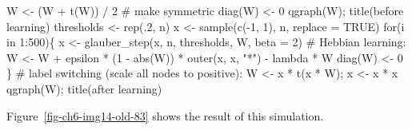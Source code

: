 \documentclass[
  a4paper,
  DIV=11,
  numbers=noendperiod,
  oneside]{scrreprt}
\newenvironment{Shaded}{}{}
\newcommand{\AttributeTok}[1]{\textcolor[rgb]{0.84,0.23,0.29}{#1}}
\newcommand{\CommentTok}[1]{\textcolor[rgb]{0.42,0.45,0.49}{#1}}
\newcommand{\ConstantTok}[1]{\textcolor[rgb]{0.00,0.36,0.77}{#1}}
\newcommand{\ControlFlowTok}[1]{\textcolor[rgb]{0.84,0.23,0.29}{#1}}
\newcommand{\DecValTok}[1]{\textcolor[rgb]{0.00,0.36,0.77}{#1}}
\newcommand{\FunctionTok}[1]{\textcolor[rgb]{0.44,0.26,0.76}{#1}}
\newcommand{\NormalTok}[1]{\textcolor[rgb]{0.14,0.16,0.18}{#1}}
\newcommand{\OtherTok}[1]{\textcolor[rgb]{0.44,0.26,0.76}{#1}}
\newcommand{\SpecialCharTok}[1]{\textcolor[rgb]{0.00,0.36,0.77}{#1}}
\newcommand{\StringTok}[1]{\textcolor[rgb]{0.01,0.18,0.38}{#1}}
\begin{document}
\begin{Shaded}
\begin{Highlighting}[]
\NormalTok{W }\OtherTok{\textless{}{-}}\NormalTok{ (W }\SpecialCharTok{+} \FunctionTok{t}\NormalTok{(W)) }\SpecialCharTok{/} \DecValTok{2} \CommentTok{\# make symmetric}
\FunctionTok{diag}\NormalTok{(W) }\OtherTok{\textless{}{-}} \DecValTok{0}
\FunctionTok{qgraph}\NormalTok{(W); }\FunctionTok{title}\NormalTok{(}\StringTok{\textquotesingle{}before learning\textquotesingle{}}\NormalTok{)}
\NormalTok{thresholds }\OtherTok{\textless{}{-}} \FunctionTok{rep}\NormalTok{(.}\DecValTok{2}\NormalTok{, n)}
\NormalTok{x }\OtherTok{\textless{}{-}} \FunctionTok{sample}\NormalTok{(}\FunctionTok{c}\NormalTok{(}\SpecialCharTok{{-}}\DecValTok{1}\NormalTok{, }\DecValTok{1}\NormalTok{), n, }\AttributeTok{replace =} \ConstantTok{TRUE}\NormalTok{)}
\ControlFlowTok{for}\NormalTok{(i }\ControlFlowTok{in} \DecValTok{1}\SpecialCharTok{:}\DecValTok{500}\NormalTok{)\{}
\NormalTok{  x }\OtherTok{\textless{}{-}} \FunctionTok{glauber\_step}\NormalTok{(x, n, thresholds, W, }\AttributeTok{beta =} \DecValTok{2}\NormalTok{)}
  \CommentTok{\# Hebbian learning:}
\NormalTok{  W }\OtherTok{\textless{}{-}}\NormalTok{ W }\SpecialCharTok{+}\NormalTok{ epsilon }\SpecialCharTok{*}\NormalTok{ (}\DecValTok{1} \SpecialCharTok{{-}} \FunctionTok{abs}\NormalTok{(W)) }\SpecialCharTok{*} \FunctionTok{outer}\NormalTok{(x, x, }\StringTok{"*"}\NormalTok{) }\SpecialCharTok{{-}}\NormalTok{ lambda }\SpecialCharTok{*}\NormalTok{ W }
  \FunctionTok{diag}\NormalTok{(W) }\OtherTok{\textless{}{-}} \DecValTok{0}
\NormalTok{\}}
\CommentTok{\# label switching (scale all nodes to positive):}
\NormalTok{W }\OtherTok{\textless{}{-}}\NormalTok{ x }\SpecialCharTok{*} \FunctionTok{t}\NormalTok{(x }\SpecialCharTok{*}\NormalTok{ W); x }\OtherTok{\textless{}{-}}\NormalTok{ x }\SpecialCharTok{*}\NormalTok{ x}
\FunctionTok{qgraph}\NormalTok{(W); }\FunctionTok{title}\NormalTok{(}\StringTok{\textquotesingle{}after learning\textquotesingle{}}\NormalTok{)}
\end{Highlighting}
\end{Shaded}

Figure~\ref{fig-ch6-img14-old-83} shows the result of this simulation.
\end{document}

